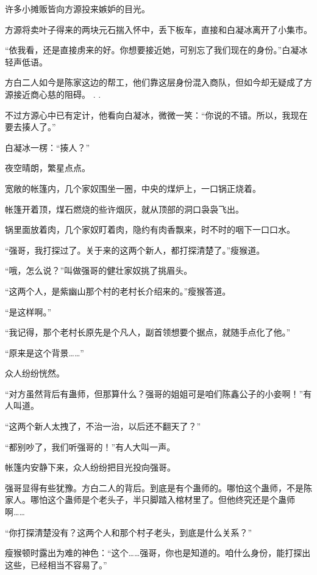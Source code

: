 
\begin{this_body}

许多小摊贩皆向方源投来嫉妒的目光。

方源将卖叶子得来的两块元石揣入怀中，丢下板车，直接和白凝冰离开了小集市。

“依我看，还是直接虏来的好。你想要接近她，可别忘了我们现在的身份。”白凝冰轻声低语。

方白二人如今是陈家这边的帮工，他们靠这层身份混入商队，但如今却无疑成了方源接近商心慈的阻碍。 . .

不过方源心中已有定计，他看向白凝冰，微微一笑：“你说的不错。所以，我现在要去揍人了。”

白凝冰一楞：“揍人？”

夜空晴朗，繁星点点。

宽敞的帐篷内，几个家奴围坐一圈，中央的煤炉上，一口锅正烧着。

帐篷开着顶，煤石燃烧的些许烟灰，就从顶部的洞口袅袅飞出。

锅里面放着肉，几个家奴盯着肉，隐约有肉香飘来，时不时的咽下一口口水。

“强哥，我打探过了。关于来的这两个新人，都打探清楚了。”瘦猴道。

“哦，怎么说？”叫做强哥的健壮家奴挑了挑眉头。

“这两个人，是紫幽山那个村的老村长介绍来的。”瘦猴答道。

“是这样啊。”

“我记得，那个老村长原先是个凡人，副首领想要个据点，就随手点化了他。”

“原来是这个背景……”

众人纷纷恍然。

“对方虽然背后有蛊师，但那算什么？强哥的姐姐可是咱们陈鑫公子的小妾啊！”有人叫道。

“这两个新人太拽了，不治一治，以后还不翻天了？”

“都别吵了，我们听强哥的！”有人大叫一声。

帐篷内安静下来，众人纷纷把目光投向强哥。

强哥显得有些犹豫。方白二人的背后。到底是有个蛊师的。哪怕这个蛊师，不是陈家人。哪怕这个蛊师是个老头子，半只脚踏入棺材里了。但他终究还是个蛊师啊……

“你打探清楚没有？这两个人和那个村子老头，到底是什么关系？”

瘦猴顿时露出为难的神色：“这个……强哥，你也是知道的。咱什么身份，能打探出这些，已经相当不容易了。”


\end{this_body}
